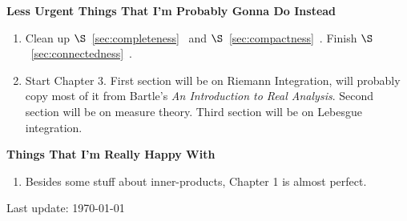 \documentclass[10pt,twoside,openany]{memoir}
\begin{document}
    \noindent \textbf{Less Urgent Things That I'm Probably Gonna Do Instead}
    \begin{enumerate}[label = (\arabic*),itemsep=1pt,topsep=3pt]
        \item Clean up $\S$~\ref{sec:completeness}~ and $\S$~\ref{sec:compactness}~. Finish $\S$~\ref{sec:connectedness}~.
        \item Start Chapter 3. First section will be on Riemann Integration, will probably copy most of it from Bartle's \textit{An Introduction to Real Analysis}. Second section will be on measure theory. Third section will be on Lebesgue integration.
    \end{enumerate}

    \noindent \textbf{Things That I'm Really Happy With}
    \begin{enumerate}[label = (\arabic*),itemsep=1pt,topsep=3pt]
        \item Besides some stuff about inner-products, Chapter 1 is almost perfect.
    \end{enumerate}
    \fi


    \vfill
    \specialdate
    Last update: \today

    
    
\end{document}
